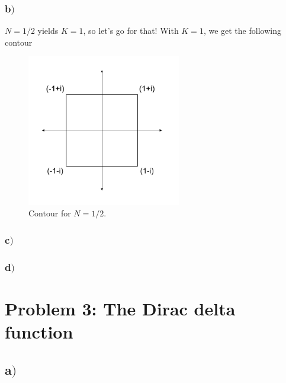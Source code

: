 \documentclass{article}
\begin{document}
\subsubsection*{b$)$}
$N = 1/2$ yields $K = 1$, so let's go for that! With $K = 1$, we get the following contour
\begin{figure}[h!]
\centering
\includegraphics[width=0.6\textwidth]{complex_contour}
\caption{Contour for $N=1/2$.}
\label{fig:figure_label}
\end{figure}




\subsubsection*{c$)$}

\subsubsection*{d$)$}

\section*{Problem 3: The Dirac delta function}

\subsection*{a$)$}

\end{document}
